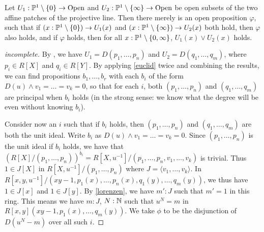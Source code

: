 \begin{lemma}
  Let $U_1 : \mathbb{P}^1\setminus\{0\} \to \mathrm{Open}$ and
  $U_2 : \mathbb{P}^1\setminus\{\infty\} \to \mathrm{Open}$ be open subsets of the two affine patches
  of the projective line.
  Then there merely is an open proposition $\varphi$, such that
  if $(x : \mathbb{P}^1\setminus\{0\}) \to U_1(x)$ and
  $(x : \mathbb{P}^1\setminus\{\infty\}) \to U_2(x)$ both hold, then $\varphi$ also holds,
  and if $\varphi$ holds, then for all $x : \mathbb{P}^1\setminus\{0,\infty\}$,
  $U_1(x) \vee U_2(x)$ holds.
\end{lemma}
\begin{proof}[incomplete]
  By \cite[Theorem 4.2.7]{draft}, we have $U_1 = D(p_1,\ldots,p_n)$ and
  $U_2 = D(q_1,\ldots,q_m)$, where $p_i \in R[X]$ and $q_i \in R[Y]$.
  By applying \cref{euclid} twice and combining the results, 
  we can find propositions
  $b_1,\ldots,b_r$ with each $b_i$ of the form
  $D(u) \wedge v_1 = \ldots = v_k = 0$,
  so that for each $i$, both $(p_1,\ldots,p_n)$ 
  and $(q_1,\ldots,q_m)$ are principal when $b_i$ holds
  (in the strong sense: we know what the degree will be even without knowing $b_i$).
 
  Consider now an $i$ such that if $b_i$ holds, then
  $(p_1,\ldots,p_n)$ and $(q_1,\ldots,q_m)$ are both the unit ideal.
  Write $b_i$ as $D(u) \wedge v_1 = \ldots = v_k = 0$.
  Since $(p_1,\ldots,p_n)$ is the unit ideal if $b_i$ holds,
  we have that $(R[X]/(p_1,\ldots,p_n))^{b_i} = R[X,u^{-1}]/(p_1,\ldots,p_n,v_1,\ldots,v_k)$
  is trivial.
  Thus $1 \in J[X]$ in $R[X,u^{-1}]/(p_1,\ldots,p_n)$
  where $J = \langle v_1,\ldots,v_k\rangle$.
  In $R[x,y,u^{-1}]/(xy-1,p_1(x),\ldots,p_n(x),q_1(y),\ldots,q_m(y))$,
  we thus have $1 \in J[x]$ and $1 \in J[y]$.
  By \cref{lorenzen}, we have $m' : J$ such that $m' = 1$ in
  this ring.
  This means we have $m : J$, $N : \mathbb{N}$ such that $u^N = m$
  in $R[x,y](xy-1,p_1(x),\ldots,q_m(y))$.
  We take $\phi$ to be the disjunction of
  $D(u^N-m)$ over all such $i$.
\end{proof}
